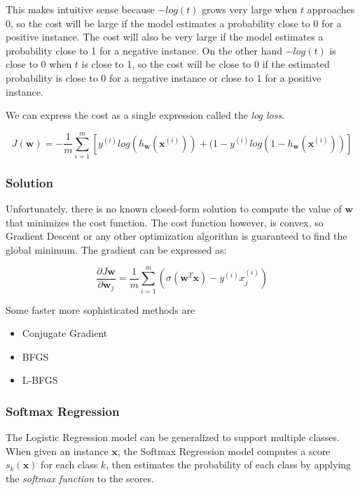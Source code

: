\documentclass[12pt]{article}
\begin{document}
            This makes intuitive sense because $-log(t)$ grows very large when $t$ approaches 0, so the cost will be large if the model estimates a probability close to 0 for a positive instance.
            The cost will also be very large if the model estimates a probability close to 1 for a negative instance. On the other hand $-log(t)$ is close to 0 when $t$ is close to 1, so the cost
            will be close to 0 if the estimated probability is close to 0 for a negative instance or close to 1 for a positive instance.

            We can express the cost as a single expression called the \textit{log loss}. 

            $$J(\boldsymbol{w}) = -\frac{1}{m}\sum_{i=1}^m[y^{(i)} log(h_{\boldsymbol{w}}(\boldsymbol{x}^{(i)})) + (1-y^{(i)}log(1-h_{\boldsymbol{w}}(\boldsymbol{x}^{(i)}))] $$

        \subsubsection{Solution}
            Unfortunately, there is no known closed-form solution to compute the value of $\boldsymbol{w}$ that minimizes the cost function. The cost function however, is convex, so Gradient Descent or 
            any other optimization algorithm is guaranteed to find the global minimum. The gradient can be expressed as:

            $$ \frac{\partial J{\boldsymbol{w}}}{\partial \boldsymbol{w}_j} = \frac{1}{m}\sum_{i=1}^m(\sigma(\boldsymbol{w}^T\boldsymbol{x}) - y^{(i)} x_j^{(i)}) $$
            
            Some faster more sophisticated methods are
            \begin{itemize}
                \item Conjugate Gradient
                \item BFGS
                \item L-BFGS
            \end{itemize}

        \subsubsection{Softmax Regression}
            The Logistic Regression model can be generalized to support multiple classes. When given an instance $\boldsymbol{x}$, the Softmax Regression model computes a score $s_k(\boldsymbol{x})$ for each class $k$,
            then estimates the probability of each class by applying the \textit{softmax function} to the scores. 
\end{document}
